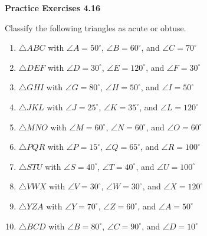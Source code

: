 \vspace{0.3ex}
\noindent\textbf{Practice Exercises 4.16}

\vspace{0.2ex}

Classify the following triangles as acute or obtuse.

\begin{enumerate}
    \item \(\triangle ABC\) with \(\angle A = 50^\circ\), \(\angle B = 60^\circ\), and \(\angle C = 70^\circ\)
    \item \(\triangle DEF\) with \(\angle D = 30^\circ\), \(\angle E = 120^\circ\), and \(\angle F = 30^\circ\)
    \item \(\triangle GHI\) with \(\angle G = 80^\circ\), \(\angle H = 50^\circ\), and \(\angle I = 50^\circ\)
    \item \(\triangle JKL\) with \(\angle J = 25^\circ\), \(\angle K = 35^\circ\), and \(\angle L = 120^\circ\)
    \item \(\triangle MNO\) with \(\angle M = 60^\circ\), \(\angle N = 60^\circ\), and \(\angle O = 60^\circ\)
    \item \(\triangle PQR\) with \(\angle P = 15^\circ\), \(\angle Q = 65^\circ\), and \(\angle R = 100^\circ\)
    \item \(\triangle STU\) with \(\angle S = 40^\circ\), \(\angle T = 40^\circ\), and \(\angle U = 100^\circ\)
    \item \(\triangle VWX\) with \(\angle V = 30^\circ\), \(\angle W = 30^\circ\), and \(\angle X = 120^\circ\)
    \item \(\triangle YZA\) with \(\angle Y = 70^\circ\), \(\angle Z = 60^\circ\), and \(\angle A = 50^\circ\)
    \item \(\triangle BCD\) with \(\angle B = 80^\circ\), \(\angle C = 90^\circ\), and \(\angle D = 10^\circ\)
\end{enumerate}
